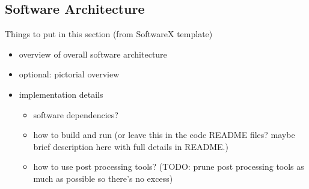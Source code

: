 \documentclass[preprint,12pt, a4paper]{elsarticle}
\begin{document}
%
%

\subsection{Software Architecture}
\label{sub:architecture}

Things to put in this section (from SoftwareX template)
\begin{itemize}
	\item overview of overall software architecture
	\item optional: pictorial overview
	\item implementation details
	\begin{itemize}
		\item software dependencies?
		\item how to build and run (or leave this in the code README files? maybe brief description here with full details in README.)
		\item how to use post processing tools? (TODO: prune post processing tools as much as possible so there's no excess)
	\end{itemize}
\end{itemize}
\end{document}
